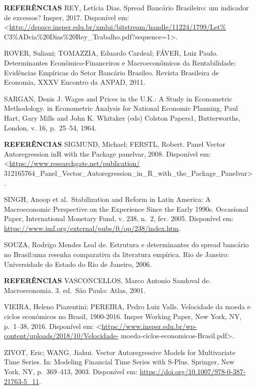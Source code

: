 \documentclass[
  ignorenonframetext,
  aspectratio=169,
  ignorenonframetext]{beamer}
\begin{document}
\begin{frame}{\textbf{REFERÊNCIAS}}
\protect\hypertarget{referuxeancias-20}{}
REY, Letícia Dias. Spread Bancário Brasileiro: um indicador de excessos?
Insper, 2017. Disponível em:
\textless{}\url{http://dspace.insper.edu.br/xmlui/bitstream/handle/11224/1799/Let\%}
C3\%ADcia\%20Dias\%20Rey\_Trabalho.pdf?sequence=1\textgreater.

ROVER, Suliani; TOMAZZIA, Eduardo Cardeal; FÁVER, Luiz Paulo.
Determinantes Econômico-Financeiros e Macroeconômicos da Rentabilidade:
Evidências Empíricas do Setor Bancário Brasileo. Revista Brasileira de
Economia, XXXV Encontro da ANPAD, 2011.

SARGAN, Denis J. Wages and Prices in the U.K.: A Study in Econometric
Methodology. in Econometric Analysis for National Economic Planning,
Paul Hart, Gary Mills and John K. Whitaker (eds) Colston Papers1,
Butterworths, London, v. 16, p.~25--54, 1964.
\end{frame}

\begin{frame}{\textbf{REFERÊNCIAS}}
\protect\hypertarget{referuxeancias-21}{}
SIGMUND, Michael; FERSTL, Robert. Panel Vector Autoregression inR with
the Package panelvar, 2008. Disponível em:
\textless{}\url{https://www.researchgate.net/publication/}
312165764\_Panel\_Vector\_Autoregression\_in\_R\_with\_the\_Package\_Panelvar\textgreater.

SINGH, Anoop et al.~Stabilization and Reform in Latin America: A
Macroeconomic Perspective on the Experience Since the Early 1990s.
Occasional Paper, International Monetary Fund, v. 238, n.~2, fev. 2005.
Disponível em:
\url{https://www.imf.org/external/pubs/ft/op/238/index.htm}.

SOUZA, Rodrigo Mendes Leal de. Estrutura e determinantes do spread
bancário no Brasil:uma resenha comparativa da literatura empírica. Rio
de Janeiro: Universidade do Estado do Rio de Janeiro, 2006.
\end{frame}

\begin{frame}{\textbf{REFERÊNCIAS}}
\protect\hypertarget{referuxeancias-22}{}
VASCONCELLOS, Marco Antonio Sandoval de. Macroeconomia. 3. ed.~São
Paulo: Atlas, 2001.

VIEIRA, Heleno Piazentini; PEREIRA, Pedro Luiz Valls. Velocidade da
moeda e ciclos econômicos no Brasil, 1900-2016. Insper Working Paper,
New York, NY, p.~1--38, 2016. Disponível em:
\textless{}\url{https://www.insper.edu.br/wp-content/uploads/2018/10/Velocidade-}
moeda-ciclos-economicos-Brasil.pdf\textgreater.

ZIVOT, Eric; WANG, Jiahui. Vector Autoregressive Models for Multivariate
Time Series. In: Modeling Financial Time Series with S-Plus. Springer,
New York, NY, p.~369--413, 2003. Disponível em:
\url{https://doi.org/10.1007/978-0-387-21763-5_11}.
\end{frame}
\end{document}
